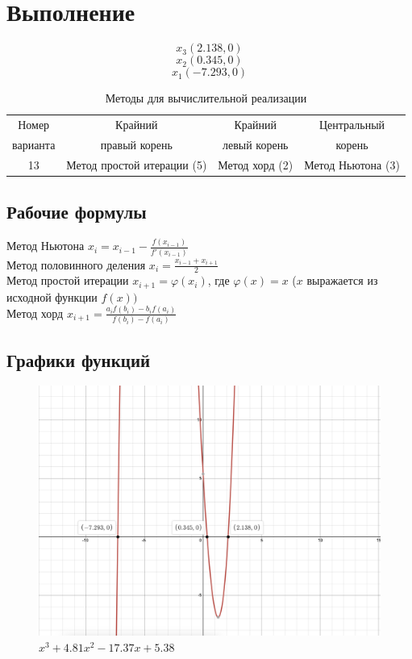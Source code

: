 \documentclass{article}
\begin{document}
\section{Выполнение}
      $$x_3(2.138,0)$$
      $$x_2(0.345,0)$$
      $$x_1(-7.293,0)$$
      \begin{table}[H]
            \centering
            \begin{tabular}{|*{4}{c|}}
            \hline
            Номер & Крайний & Крайний & Центральный  \\
            варианта & правый корень & левый корень & корень \\
            \hline
            13 & Метод простой итерации (5) & Метод хорд (2) & Метод Ньютона (3) \\
            \hline
            \end{tabular}
            \caption{Методы для вычислительной реализации}
      \end{table}
      \subsection{Рабочие формулы}
            Метод Ньютона $x_i=x_{i-1}-\frac{f(x_{i-1})}{f'(x_{i-1})}$ \\
            Метод половинного деления $x_i=\frac{x_{i-1}+x_{i+1}}{2}$ \\
            Метод простой итерации $x_{i+1}=\varphi(x_i)$, где $\varphi(x)=x$ ($x$ выражается из исходной функции $f(x))$\\
            Метод хорд $x_{i+1}=\frac{a_i f(b_i)-b_i f(a_i)}{f(b_i)-f(a_i)}$
      
      \subsection{Графики функций}
            \begin{figure}[H] 
                  \begin{center}  
                        \includegraphics[scale=0.4]{graph.png}
                        \caption{\small \sl  $x^3+4.81x^2-17.37x+5.38$}  
                  \end{center}  
            \end{figure}
\end{document}
